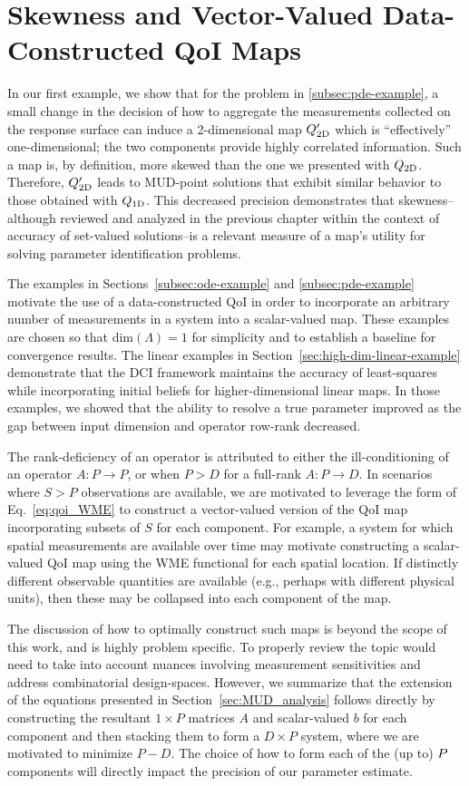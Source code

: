 \section{Skewness and Vector-Valued Data-Constructed QoI Maps}
In our first example, we show that for the problem in \ref{subsec:pde-example}, a small change in the decision of how to aggregate the measurements collected on the response surface can induce a 2-dimensional map $Q_\text{2D}^\prime$ which is ``effectively'' one-dimensional; the two components provide highly correlated information.
Such a map is, by definition, more skewed than the one we presented with $Q_\text{2D}$.
Therefore, $Q_\text{2D}^\prime$ leads to MUD-point solutions that exhibit similar behavior to those obtained with $Q_\text{1D}$.
This decreased precision demonstrates that skewness\---although reviewed and analyzed in the previous chapter within the context of accuracy of set-valued solutions\---is a relevant measure of a map's utility for solving parameter identification problems.

The examples in Sections~\ref{subsec:ode-example} and \ref{subsec:pde-example} motivate the use of a data-constructed QoI in order to incorporate an arbitrary number of measurements in a system into a scalar-valued map.
These examples are chosen so that $\text{dim}({\Lambda}) = 1$ for simplicity and to establish a baseline for convergence results.
The linear examples in Section~\ref{sec:high-dim-linear-example} demonstrate that the DCI framework maintains the accuracy of least-squares while incorporating initial beliefs for higher-dimensional linear maps.
In those examples, we showed that the ability to resolve a true parameter improved as the gap between input dimension and operator row-rank decreased.

The rank-deficiency of an operator is attributed to either the ill-conditioning of an operator $A:P\to P$, or when $P>D$ for a full-rank $A:P\to D$.
In scenarios where $S>P$ observations are available, we are motivated to leverage the form of Eq.~\eqref{eq:qoi_WME} to construct a vector-valued version of the QoI map incorporating subsets of $S$ for each component.
For example, a system for which spatial measurements are available over time may motivate constructing a scalar-valued QoI map using the WME functional for each spatial location.
If distinctly different observable quantities are available (e.g., perhaps with different physical units), then these may be collapsed into each component of the map.

The discussion of how to optimally construct such maps is beyond the scope of this work, and is highly problem specific.
To properly review the topic would need to take into account nuances involving measurement sensitivities and address combinatorial design-spaces.
However, we summarize that the extension of the equations presented in Section~\ref{sec:MUD_analysis} follows directly by constructing the resultant $1\times P$ matrices $A$ and scalar-valued $b$ for each component and then stacking them to form a $D\times P$ system, where we are motivated to minimize $P-D$.
The choice of how to form each of the (up to) $P$ components will directly impact the precision of our parameter estimate.
